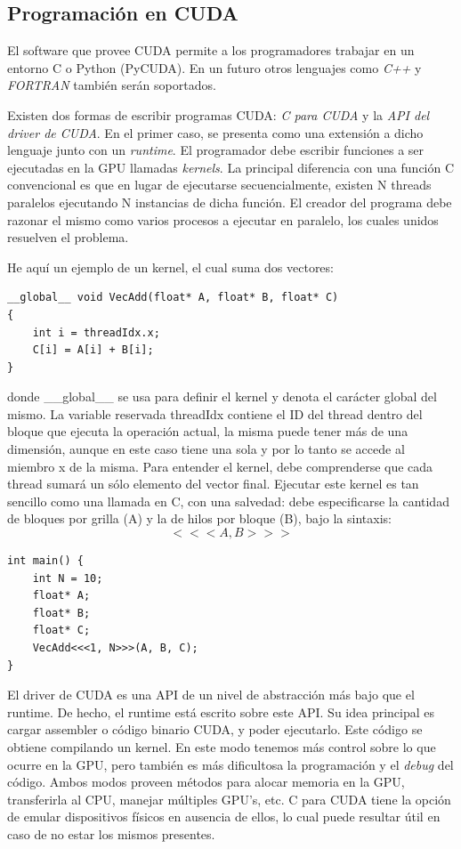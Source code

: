 \subsection{Programación en CUDA}
El software que provee CUDA permite a los programadores trabajar en un entorno C o Python (PyCUDA).
En un futuro otros lenguajes como {\em C++} y {\em FORTRAN} tambi\'en ser\'an soportados. 

Existen dos formas de escribir programas CUDA: {\em C para CUDA} y la {\em API del driver de CUDA}.
En el primer caso, se presenta como una extensi\'on a dicho lenguaje junto con un {\em runtime}.
El programador debe escribir funciones a ser ejecutadas en la GPU llamadas {\em kernels}. 
La principal diferencia con una funci\'on C convencional es que en lugar de ejecutarse secuencialmente, existen N threads paralelos ejecutando N instancias de dicha funci\'on. 
El creador del programa debe razonar el mismo como varios procesos a ejecutar en paralelo, los cuales unidos resuelven el problema.

He aqu\'i un ejemplo de un kernel, el cual suma dos vectores:

\begin{verbatim}
__global__ void VecAdd(float* A, float* B, float* C)
{
    int i = threadIdx.x;
    C[i] = A[i] + B[i];
}
\end{verbatim}

donde \_\_global\_\_ se usa para definir el kernel y denota el car\'acter global del mismo.
La variable reservada threadIdx contiene el ID del thread dentro del bloque que ejecuta la operaci\'on actual, la misma puede tener m\'as de una dimensi\'on, aunque en este caso tiene una sola y por lo tanto se accede al miembro x de la misma.
Para entender el kernel, debe comprenderse que cada thread sumar\'a un s\'olo elemento del vector final.
Ejecutar este kernel es tan sencillo como una llamada en C, con una salvedad: debe especificarse la cantidad de bloques por grilla (A) y la de hilos por bloque (B), bajo la sintaxis:
$$<<<A , B >>>$$

\begin{verbatim}
int main() {
    int N = 10;
    float* A;
    float* B;
    float* C;
    VecAdd<<<1, N>>>(A, B, C);
}

\end{verbatim}


El driver de CUDA es una API de un nivel de abstracci\'on m\'as bajo que el runtime.
De hecho, el runtime est\'a escrito sobre este API.
Su idea principal es cargar assembler o c\'odigo binario CUDA, y poder ejecutarlo.
Este c\'odigo se obtiene compilando un kernel.
En este modo tenemos m\'as control sobre lo que ocurre en la GPU, pero tambi\'en es m\'as dificultosa la programaci\'on y el {\em debug} del c\'odigo.
Ambos modos proveen m\'etodos para alocar memoria en la GPU, transferirla al CPU, manejar m\'ultiples GPU's, etc.
C para CUDA tiene la opci\'on de emular dispositivos f\'isicos en ausencia de ellos, lo cual puede resultar \'util en caso de no estar los mismos presentes.

